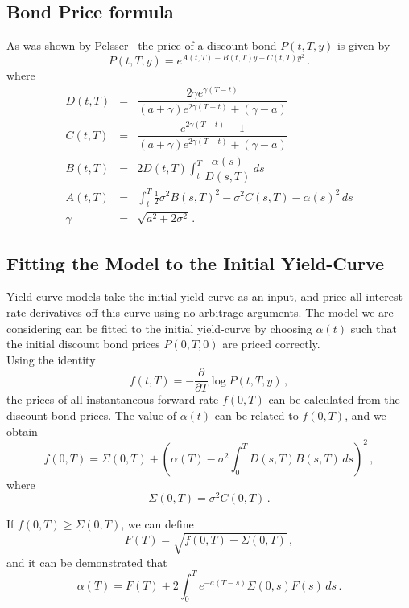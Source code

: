 \subsection{Bond Price formula}
As was shown by Pelsser~\cite{BookPelsser} the price of a discount bond $P(t,T,y)$ is given by
\begin{equation}
P(t,T,y) = \displaystyle{e}^{\displaystyle{A(t,T) - B(t,T) y - C(t,T) y^2 }} \, .
\end{equation}
where
\begin{eqnarray}
D(t,T) & = & \dfrac{2\gamma e^{\gamma(T-t)}}{(a+\gamma)e^{2\gamma(T-t)}+(\gamma - a)} \nonumber \\
C(t,T) & = & \dfrac{e^{2\gamma(T-t)}-1}{(a+\gamma)e^{2\gamma(T-t)}+(\gamma - a)} \nonumber \\
B(t,T) & = & 2 D(t,T) \displaystyle{ \int_t^T \dfrac{\alpha(s)}{D(s,T)} \, ds }\nonumber \\
A(t,T) & = & \displaystyle{\int_t^T \frac{1}{2}\sigma^2 B(s,T)^2 - \sigma^2 C(s,T) - \alpha(s)^2 \, ds  } \nonumber \\
\gamma & = & \sqrt{a^2+2\sigma^2} \, .
\end{eqnarray}

\subsection{Fitting the Model to the Initial Yield-Curve}
Yield-curve models take the initial yield-curve as an input, and price all interest rate derivatives off this curve using no-arbitrage arguments. The model we are considering can be fitted to the initial yield-curve by choosing $\alpha(t)$ such that the initial discount bond prices $P(0,T,0)$ are priced correctly.\\
Using the identity
\begin{equation}
f(t,T)= - \dfrac{ \partial }{ \partial T } \log{P(t,T,y)} \, ,
\end{equation}
the prices of all instantaneous forward rate $f(0,T)$ can be calculated from the discount bond prices. The value of $\alpha(t)$ can be related to $f(0,T)$, and we obtain
\begin{equation}
f(0,T) = \Sigma(0,T) + {\left( \alpha(T) - \sigma^2 \int_0^T D(s,T) B(s,T) \, ds \right)}^2 \, ,
\end{equation}
where
$$ \Sigma(0,T) = \sigma^2 C(0,T) \, .$$


If $f(0,T) \geq \Sigma(0,T)$, we can define
\begin{equation}
F(T) = \sqrt{f(0,T) - \Sigma(0,T)} \, ,
\end{equation}
and it can be demonstrated that
\begin{equation}
\alpha(T) = F(T) + 2 \int_0^T e^{\displaystyle{-a(T-s)}} \Sigma(0,s) F(s) \, ds \, .
\end{equation}

